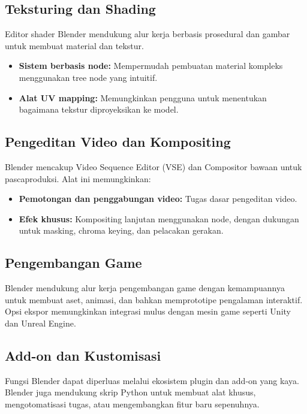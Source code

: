 \subsection{Teksturing dan Shading}
Editor shader Blender mendukung alur kerja berbasis prosedural dan gambar untuk membuat material dan tekstur.
\begin{itemize}
    \item \textbf{Sistem berbasis node:} Mempermudah pembuatan material kompleks menggunakan tree node yang intuitif.
    \item \textbf{Alat UV mapping:} Memungkinkan pengguna untuk menentukan bagaimana tekstur diproyeksikan ke model.
\end{itemize}

\subsection{Pengeditan Video dan Kompositing}
Blender mencakup Video Sequence Editor (VSE) dan Compositor bawaan untuk pascaproduksi. Alat ini memungkinkan:
\begin{itemize}
    \item \textbf{Pemotongan dan penggabungan video:} Tugas dasar pengeditan video.
    \item \textbf{Efek khusus:} Kompositing lanjutan menggunakan node, dengan dukungan untuk masking, chroma keying, dan pelacakan gerakan.
\end{itemize}

\subsection{Pengembangan Game}
Blender mendukung alur kerja pengembangan game dengan kemampuannya untuk membuat aset, animasi, dan bahkan memprototipe pengalaman interaktif. Opsi ekspor memungkinkan integrasi mulus dengan mesin game seperti Unity dan Unreal Engine.

\subsection{Add-on dan Kustomisasi}
Fungsi Blender dapat diperluas melalui ekosistem plugin dan add-on yang kaya. Blender juga mendukung skrip Python untuk membuat alat khusus, mengotomatisasi tugas, atau mengembangkan fitur baru sepenuhnya.

